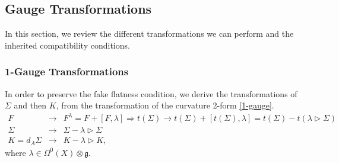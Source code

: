 \documentclass[onecolumn]{article}
\theoremstyle{theorem}
\theoremstyle{remark}
\theoremstyle{example}
\theoremstyle{definition}
\numberwithin{equation}{section}
\begin{document}
\subsection{Gauge Transformations}\label{1-2gauge}
In this section, we review the different transformations we can perform and the inherited compatibility conditions.

\subsubsection{1-Gauge Transformations}
In order to preserve the fake flatness condition, we derive the transformations of $\Sigma$ and then $K$, from the transformation of the curvature 2-form  \eqref{1-gauge}. 
\begin{eqnarray}
F&\rightarrow& F^\lambda = F + [F,\lambda]\Rightarrow t(\Sigma) \rightarrow t(\Sigma)+ [t(\Sigma),\lambda] = t(\Sigma)- t(\lambda \rhd \Sigma) \nonumber\\
\Sigma &\rightarrow& \Sigma - \lambda \rhd \Sigma \nonumber\\
K=d_A \Sigma &\rightarrow& K- \lambda \rhd K,\label{1gau1}
\end{eqnarray}
where $\lambda\in\Omega^0(X)\otimes\mathfrak{g}$. 
\end{document}
